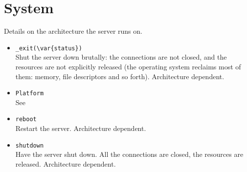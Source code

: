 \section{System}
Details on the architecture the \urbi server runs on.

\begin{itemize}
\item \lstinline'_exit(\var{status})'\\
  Shut the server down brutally: the connections are not closed, and
  the resources are not explicitly released (the operating system
  reclaims most of them: memory, file descriptors and so forth).
  Architecture dependent.

\item \lstinline'Platform'\\
  See 

\item \lstinline'reboot'\\
  Restart the \urbi server.  Architecture dependent.

\item \lstinline'shutdown'\\
  Have the \urbi server shut down.  All the connections are closed,
  the resources are released.  Architecture dependent.
\end{itemize}

